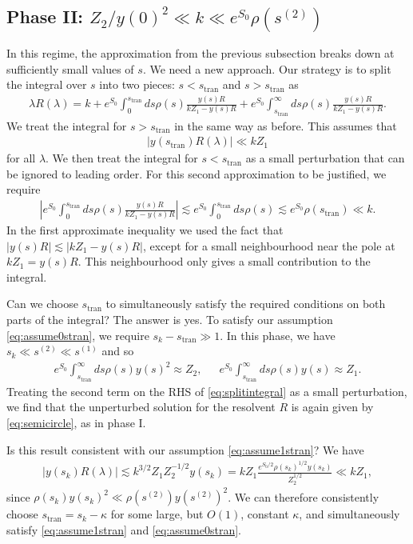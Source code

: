 \documentclass[11pt]{article}
\newcommand{\stran}{s_{\text{tran}}}
\newcommand{\smax}{s_k}
\numberwithin{equation}{section}
\begin{document}
\subsection*{Phase II: $Z_2/y(0)^2 \ll k \ll e^{S_0} \rho( s^{(2)})$}
In this regime, the approximation from the previous subsection breaks down at sufficiently small values of $s$. We need a new approach. Our strategy is to split the integral over $s$ into two pieces: $s < \stran$ and $s >s_\text{tran}$ as
\begin{align}\label{eq:splitintegral}
\lambda R(\lambda)  = k + e^{S_0}\int_0^{\stran} ds \rho(s) \frac{y(s) R}{k Z_1 - y(s) R} +  e^{S_0}\int_{\stran}^\infty ds \rho(s) \frac{y(s) R}{k Z_1 - y(s) R}.
\end{align}
We treat the integral for $s > \stran$ in the same way as before. This assumes that
\begin{align}\label{eq:assume1stran}
|y(\stran) R(\lambda)| \ll k Z_1
\end{align}
for all $\lambda$. We then treat the integral for $s < \stran$ as a small perturbation that can be ignored to leading order. For this second approximation to be justified, we require
\begin{align} \label{eq:assume0stran}
\left|e^{S_0}\int_0^{\stran} ds \rho(s) \frac{y(s) R}{k Z_1 - y(s) R}\right| \lesssim e^{S_0}\int_0^{\stran} ds \rho(s) \lesssim e^{S_0} \rho(\stran) \ll k.
\end{align}
In the first approximate inequality we used the fact that $|y(s) R| \lesssim |k Z_1 - y(s) R|$, except for a small neighbourhood near the pole at $k Z_1 = y(s) R$. This neighbourhood only gives a small contribution to the integral.

Can we choose $\stran$ to simultaneously satisfy the required conditions on both parts of the integral? The answer is yes. 
To satisfy our assumption \eqref{eq:assume0stran}, we require $\smax - \stran \gg 1$. In this phase, we have $\smax \ll s^{(2)} \ll s^{(1)}$ and so
\begin{align}
e^{S_0} \int_{\stran}^\infty ds  \rho(s) y(s)^2 \approx Z_2, \,\,\,\,\,\,\,\,\, e^{S_0} \int_{\stran}^\infty ds  \rho(s) y(s) \approx Z_1.
\end{align}
Treating the second term on the RHS of \eqref{eq:splitintegral} as a small perturbation, we find that the unperturbed solution for the resolvent $R$ is again given by \eqref{eq:semicircle}, as in phase I. 

Is this result consistent with our assumption \eqref{eq:assume1stran}? We have
\begin{align}
|y(\smax) R(\lambda)| \lesssim k^{3/2} Z_1 Z_2^{-1/2} y(\smax) = k Z_1 \frac{e^{S_0 /2} \rho({\smax})^{1/2} y(\smax)}{Z_2^{1/2}} \ll k Z_1,
\end{align}
since $\rho(\smax) y(\smax)^2 \ll \rho(s^{(2)}) y(s^{(2)})^2$. We can therefore consistently choose $\stran = \smax - \kappa$ for some large, but $O(1)$, constant $\kappa$, and simultaneously satisfy \eqref{eq:assume1stran} and \eqref{eq:assume0stran}.
\end{document}
